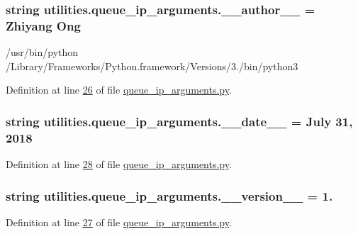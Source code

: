 \subsubsection[{\+\_\+\+\_\+author\+\_\+\+\_\+}]{\setlength{\rightskip}{0pt plus 5cm}string utilities.\+queue\+\_\+ip\+\_\+arguments.\+\_\+\+\_\+author\+\_\+\+\_\+ = \textquotesingle{}Zhiyang Ong\textquotesingle{}}\label{namespaceutilities_1_1queue__ip__arguments_adc999d785e9803ef585833d4c1ae53e4}


/usr/bin/python /\+Library/\+Frameworks/\+Python.framework/\+Versions/3./bin/python3 



Definition at line \hyperlink{queue__ip__arguments_8py_source_l00026}{26} of file \hyperlink{queue__ip__arguments_8py_source}{queue\+\_\+ip\+\_\+arguments.\+py}.

\hypertarget{namespaceutilities_1_1queue__ip__arguments_a43f24226d75dbc13271de84f469f6944}{}
\subsubsection[{\+\_\+\+\_\+date\+\_\+\+\_\+}]{\setlength{\rightskip}{0pt plus 5cm}string utilities.\+queue\+\_\+ip\+\_\+arguments.\+\_\+\+\_\+date\+\_\+\+\_\+ = \textquotesingle{}July 31, 2018\textquotesingle{}}\label{namespaceutilities_1_1queue__ip__arguments_a43f24226d75dbc13271de84f469f6944}


Definition at line \hyperlink{queue__ip__arguments_8py_source_l00028}{28} of file \hyperlink{queue__ip__arguments_8py_source}{queue\+\_\+ip\+\_\+arguments.\+py}.

\hypertarget{namespaceutilities_1_1queue__ip__arguments_aac0867ebe34eaed5fb081f33e4ac9740}{}
\subsubsection[{\+\_\+\+\_\+version\+\_\+\+\_\+}]{\setlength{\rightskip}{0pt plus 5cm}string utilities.\+queue\+\_\+ip\+\_\+arguments.\+\_\+\+\_\+version\+\_\+\+\_\+ = \textquotesingle{}1.\textquotesingle{}}\label{namespaceutilities_1_1queue__ip__arguments_aac0867ebe34eaed5fb081f33e4ac9740}


Definition at line \hyperlink{queue__ip__arguments_8py_source_l00027}{27} of file \hyperlink{queue__ip__arguments_8py_source}{queue\+\_\+ip\+\_\+arguments.\+py}.


